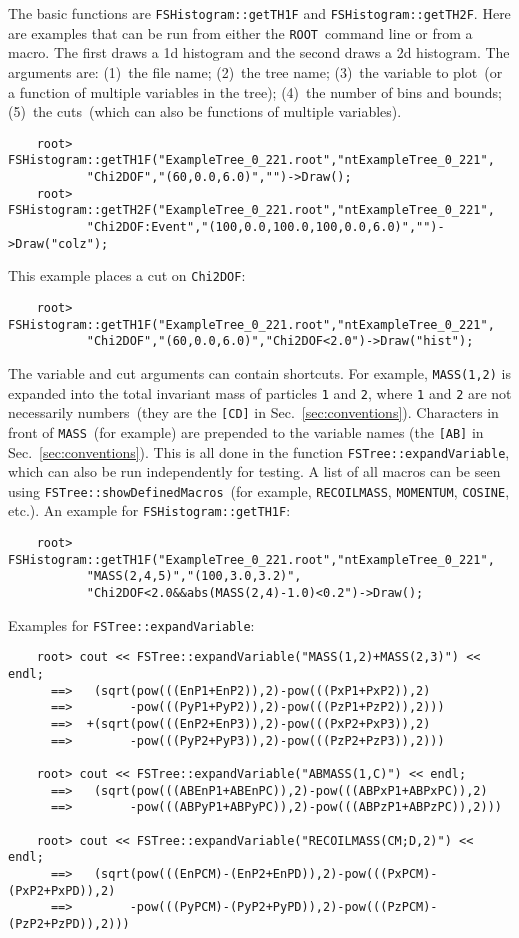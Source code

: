 \documentclass[11pt]{article}
\newcommand{\ROOT}{{\tt ROOT}}
\begin{document}
The basic functions are {\tt FSHistogram::getTH1F} and {\tt FSHistogram::getTH2F}.  Here are examples that can be run from either the \ROOT\ command line or from a macro.  The first draws a 1d histogram and the second draws a 2d histogram.  The arguments are: (1)~the file name; (2)~the tree name; (3)~the variable to plot~(or a function of multiple variables in the tree); (4)~the number of bins and bounds; (5)~the cuts~(which can also be functions of multiple variables).
\begin{verbatim}
    root> FSHistogram::getTH1F("ExampleTree_0_221.root","ntExampleTree_0_221",
           "Chi2DOF","(60,0.0,6.0)","")->Draw();
    root> FSHistogram::getTH2F("ExampleTree_0_221.root","ntExampleTree_0_221",
           "Chi2DOF:Event","(100,0.0,100.0,100,0.0,6.0)","")->Draw("colz");
\end{verbatim}
This example places a cut on {\tt Chi2DOF}:
\begin{verbatim}
    root> FSHistogram::getTH1F("ExampleTree_0_221.root","ntExampleTree_0_221",
           "Chi2DOF","(60,0.0,6.0)","Chi2DOF<2.0")->Draw("hist");
\end{verbatim}
The variable and cut arguments can contain shortcuts.  For example, {\tt MASS(1,2)} is expanded into the total invariant mass of particles {\tt 1} and {\tt 2}, where {\tt 1} and {\tt 2} are not necessarily numbers~(they are the {\tt [CD]} in Sec.~\ref{sec:conventions}).  Characters in front of {\tt MASS}~(for example) are prepended to the variable names (the {\tt [AB]} in Sec.~\ref{sec:conventions}).  This is all done in the function {\tt FSTree::expandVariable}, which can also be run independently for testing.  
A list of all macros can be seen using {\tt FSTree::showDefinedMacros}~(for example, {\tt RECOILMASS}, {\tt MOMENTUM}, {\tt COSINE}, etc.).  An example for {\tt FSHistogram::getTH1F}:
\begin{verbatim}
    root> FSHistogram::getTH1F("ExampleTree_0_221.root","ntExampleTree_0_221",
           "MASS(2,4,5)","(100,3.0,3.2)",
           "Chi2DOF<2.0&&abs(MASS(2,4)-1.0)<0.2")->Draw();
\end{verbatim}
Examples for {\tt FSTree::expandVariable}:
\begin{verbatim}
    root> cout << FSTree::expandVariable("MASS(1,2)+MASS(2,3)") << endl;
      ==>   (sqrt(pow(((EnP1+EnP2)),2)-pow(((PxP1+PxP2)),2)
      ==>        -pow(((PyP1+PyP2)),2)-pow(((PzP1+PzP2)),2)))
      ==>  +(sqrt(pow(((EnP2+EnP3)),2)-pow(((PxP2+PxP3)),2)
      ==>        -pow(((PyP2+PyP3)),2)-pow(((PzP2+PzP3)),2)))

    root> cout << FSTree::expandVariable("ABMASS(1,C)") << endl;
      ==>   (sqrt(pow(((ABEnP1+ABEnPC)),2)-pow(((ABPxP1+ABPxPC)),2)
      ==>        -pow(((ABPyP1+ABPyPC)),2)-pow(((ABPzP1+ABPzPC)),2)))

    root> cout << FSTree::expandVariable("RECOILMASS(CM;D,2)") << endl;
      ==>   (sqrt(pow(((EnPCM)-(EnP2+EnPD)),2)-pow(((PxPCM)-(PxP2+PxPD)),2)
      ==>        -pow(((PyPCM)-(PyP2+PyPD)),2)-pow(((PzPCM)-(PzP2+PzPD)),2)))
\end{verbatim}
\end{document}
